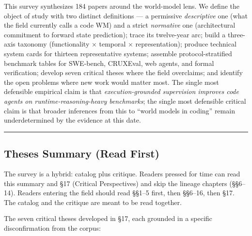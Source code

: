 \documentclass{article}
\begin{document}
This survey synthesizes 184 papers around the world-model lens. We
define the object of study with two distinct definitions --- a
permissive \emph{descriptive} one (what the field currently calls a code
WM) and a strict \emph{normative} one (architectural commitment to
forward state prediction); trace its twelve-year arc; build a three-axis
taxonomy (functionality × temporal × representation); produce technical
system cards for thirteen representative systems; assemble
protocol-stratified benchmark tables for SWE-bench, CRUXEval, web
agents, and formal verification; develop seven critical theses where the
field overclaims; and identify the open problems where new work would
matter most. The single most defensible empirical claim is that
\emph{execution-grounded supervision improves code agents on
runtime-reasoning-heavy benchmarks}; the single most defensible critical
claim is that broader inferences from this to ``world models in coding''
remain underdetermined by the evidence at this date.

\begin{center}\rule{0.5\linewidth}{0.5pt}\end{center}

\hypertarget{theses-summary-read-first}{%
\subsection{Theses Summary (Read
First)}\label{theses-summary-read-first}}

The survey is a hybrid: catalog plus critique. Readers pressed for time
can read this summary and §17 (Critical Perspectives) and skip the
lineage chapters (§§6--14). Readers entering the field should read
§§1--5 first, then §§6--16, then §17. The catalog and the critique are
meant to be read together.

The seven critical theses developed in §17, each grounded in a specific
disconfirmation from the corpus:
\end{document}
